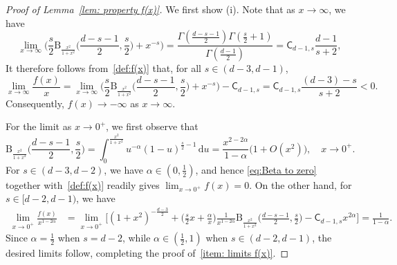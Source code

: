 \documentclass[10pt,a4paper]{amsart}
\newcommand{\ud}{\, \mathrm{d}}
\begin{document}
\begin{proof}[Proof of Lemma~\ref{lem: property f(x)}]
We first show \textrm{(i)}. Note that as $x\to\infty$, we have 
\begin{equation}\label{eq:Beta completion}
    \lim_{x\to \infty}\Big(\frac{s}{2}\mathrm{B}_{\frac{x^2}{1+x^2}}\Big(\frac{d-s-1}{2},\frac{s}{2}\Big)+x^{-s}\Big) 
    = \frac{\Gamma(\frac{d-s-1}{2})\Gamma(\frac{s}{2}+1)} {\Gamma(\frac{d-1}{2})}
    = \mathsf{C}_{d-1,s}\frac{d-1}{s+2},
\end{equation}
It therefore follows from~\eqref{def:f(x)} that, for all $s\in(d-3,d-1)$,
\begin{equation}
    \lim_{x\to\infty} \frac{f(x)}{x} =\lim_{x\to \infty}
    \Big(\frac{s}{2}\mathrm{B}_{\frac{x^2}{1+x^2}}\Big(\frac{d-s-1}{2},\frac{s}{2}\Big)+x^{-s}\Big) - \mathsf{C}_{d-1,s} = \mathsf{C}_{d-1,s} \frac{(d-3)-s}{s+2} <0.
\end{equation}
Consequently, $f(x)\to-\infty$ as $x\to\infty$. 

For the limit as $x\to0^+$, we first observe that 
\begin{equation}\label{eq:Beta to zero}
    \mathrm{B}_{\frac{x^2}{1+x^2}}\Big(\frac{d-s-1}{2},\frac{s}{2}\Big) =\int_0^{\frac{x^2}{1+x^2}} u^{-\alpha} (1-u)^{\frac{s}{2}-1}\ud u = \frac{x^{2-2\alpha}}{1-\alpha}\big(1+ O(x^2)\big), \quad x\to 0^+.
\end{equation}
For $s\in(d-3,d-2)$, we have $\alpha\in(0,\frac12)$, and hence \eqref{eq:Beta to zero} together with~\eqref{def:f(x)} readily gives $\lim_{x\to 0^+}f(x)=0$. On the other hand, for $s\in[d-2,d-1)$, we have
\begin{align*}
    \lim_{x\to0^+}\frac{f(x)}{x^{1-2\alpha}}
    &=
    \lim_{x\to0^+}
    \bigg[
        (1+x^2)^{-\frac{d-3}{2}}
        +
        \Big(\frac{s}{2}x+\frac{\alpha}{x}\Big)
        \frac{1}{x^{1-2\alpha}}
        \mathrm{B}_{\frac{x^2}{1+x^2}}
        \Big(
            \frac{d-s-1}{2},\frac{s}{2}
        \Big)
        -
        \mathsf{C}_{d-1,s}x^{2\alpha}
    \bigg]
    =
    \frac{1}{1-\alpha}.
\end{align*} 
Since $\alpha=\frac{1}{2}$ when $s=d-2$, while $\alpha\in(\frac{1}{2},1)$ when $s\in(d-2,d-1)$, the desired limits follow, completing the proof of~\ref{item: limits f(x)}.  


\end{proof}
\end{document}
